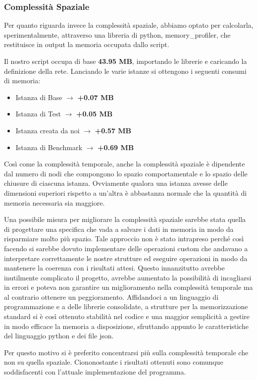 \subsubsection{Complessità Spaziale}
Per quanto riguarda invece la complessità spaziale, abbiamo optato per calcolarla, sperimentalmente, attraverso una libreria di python, memory\_profiler, che restituisce in output la memoria occupata dallo script.

Il nostro script occupa di base \textbf{43.95 MB}, importando le librerie e caricando la definizione della rete.
Lanciando le varie istanze si ottengono i seguenti consumi di memoria:
\begin{itemize}
    \item Istanza di Base $\rightarrow$ \textbf{+0.07 MB}
    \item Istanza di Test $\rightarrow$ \textbf{+0.05 MB}
    \item Istanza creata da noi $\rightarrow$ \textbf{+0.57 MB}
    \item Istanza di Benchmark $\rightarrow$\textbf{ +0.69 MB}
\end{itemize}

Così come la complessità temporale, anche la complessità spaziale è dipendente dal numero di nodi che compongono lo spazio comportamentale e lo spazio delle chiusure di ciascuna istanza. Ovviamente qualora una istanza avesse delle dimensioni superiori rispetto a un'altra è abbastanza normale che la quantità di memoria necessaria sia maggiore. 

Una possibile misura per migliorare la complessità spaziale sarebbe stata quella di progettare una specifica che vada a salvare i dati in memoria in modo da risparmiare molto più spazio. Tale approccio non è stato intrapreso perché così facendo si sarebbe dovuto implementare delle operazioni custom che andavano a interpretare correttamente le nostre strutture ed eseguire operazioni in modo da mantenere la coerenza con i risultati attesi. Questo innanzitutto avrebbe inutilmente complicato il progetto, avrebbe aumentato la possibilità di incagliarsi in errori e poteva non garantire un miglioramento nella complessità temporale ma al contrario ottenere un peggioramento. Affidandoci a un linguaggio di programmazione e a delle librerie consolidate, a strutture per la memorizzazione standard si è così ottenuto stabilità nel codice e una maggior semplicità a gestire in modo efficace la memoria a disposizione, sfruttando appunto le caratteristiche del linguaggio python e dei file json.

Per questo motivo si è preferito concentrarsi più sulla complessità temporale che non su quella spaziale. Ciononostante i risultati ottenuti sono comunque soddisfacenti con l'attuale implementazione del programma.